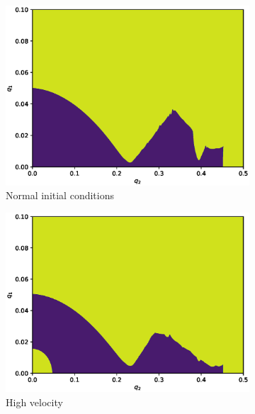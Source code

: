\begin{figure}[H]
\begin{subfigure}{.3\textwidth}
  \centering
  \includegraphics[width=\linewidth]{img/0_ions_1_electrons_q1_0.0-0.1_q2_0.0-0.5_1280x1280_3.eps}
  \caption{Normal initial conditions}
  \label{fig:normal_conds-3}
\end{subfigure}%
\begin{subfigure}{.3\textwidth}
  \centering
  \includegraphics[width=\linewidth]{img/high_velocity_3.eps}
  \caption{High velocity}
  \label{fig:high_velocity-3}
\end{subfigure}%
\begin{subfigure}{.3\textwidth}
  \centering

\end{subfigure}
\end{figure}
